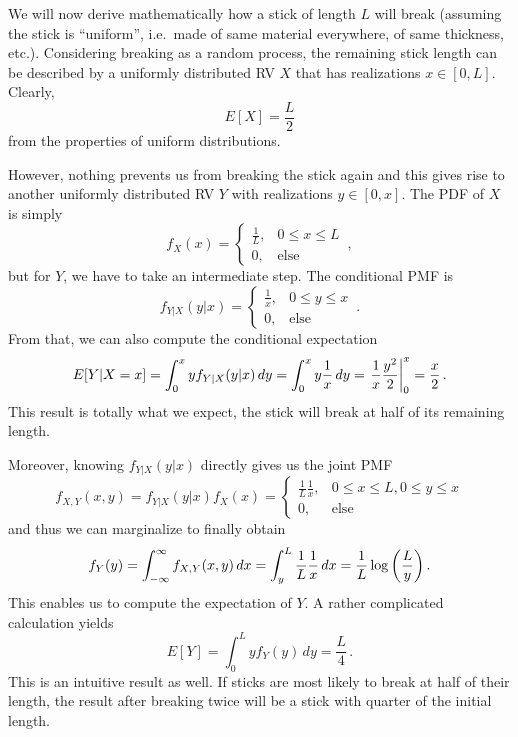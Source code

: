 \begin{ex}\label{ex:broken_stick}
We will now derive mathematically how a stick of length $L$ will break (assuming the stick is \enquote{uniform}, i.e.~made of same material everywhere, of same thickness, etc.). Considering breaking as a random process, the remaining stick length can be described by a uniformly distributed RV $X$ that has realizations $x \in [0, L]$. Clearly,
\begin{equation*}
E[X] = \frac{L}{2}
\end{equation*}
from the properties of uniform distributions.

However, nothing prevents us from breaking the stick again and this gives rise to another uniformly distributed RV $Y$ with realizations $y \in [0, x]$. The PDF of $X$ is simply
\begin{equation*}
f_X(x) = \begin{cases} \frac{1}{L}, & 0 \leq x \leq L \\ 0, & \text{else} \end{cases} \, ,
\end{equation*}
but for $Y$, we have to take an intermediate step. The conditional PMF is
\begin{equation*}
f_{Y | X}(y | x) = \begin{cases} \frac{1}{x}, & 0 \leq y \leq x \\ 0, & \text{else} \end{cases} \, .
\end{equation*}
From that, we can also compute the conditional expectation
\begin{equation*}
E[Y | X = x] = \int_0^x y f_{Y | X}(y | x) \, dy = \int_0^x y \frac{1}{x} \, dy = \eval{\frac{1}{x} \frac{y^2}{2}}_0^x = \frac{x}{2} \, .
\end{equation*}
This result is totally what we expect, the stick will break at half of its remaining length.

Moreover, knowing $f_{Y | X}(y | x)$ directly gives us the joint PMF
\begin{equation*}
f_{X, Y}(x, y) = f_{Y | X}(y | x) f_X(x) = \begin{cases} \frac{1}{L} \frac{1}{x}, & 0 \leq x \leq L, 0 \leq y \leq x \\ 0, & \text{else} \end{cases}
\end{equation*}
and thus we can marginalize to finally obtain
\begin{equation*}
f_Y(y) = \int_{- \infty}^\infty f_{X, Y}(x, y) \, dx = \int_y^L \frac{1}{L} \frac{1}{x} \, dx = \frac{1}{L} \log\qty(\frac{L}{y}) \, .
\end{equation*}
This enables us to compute the expectation of $Y$. A rather complicated calculation yields
\begin{equation*}
E[Y] = \int_0^L y f_Y(y) \, dy = \frac{L}{4} \, .
\end{equation*}
This is an intuitive result as well. If sticks are most likely to break at half of their length, the result after breaking twice will be a stick with quarter of the initial length.
\end{ex}



